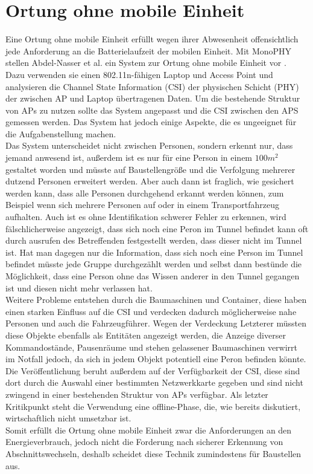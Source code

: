\section{Ortung ohne mobile Einheit}
Eine Ortung ohne mobile Einheit erfüllt wegen ihrer Abwesenheit offensichtlich jede Anforderung an die Batterielaufzeit der mobilen Einheit.
Mit MonoPHY stellen Abdel-Nasser et al. ein System zur Ortung ohne mobile Einheit vor \cite{abdel2013monophy}. \\
Dazu verwenden sie einen 802.11n-fähigen Laptop und Access Point und analysieren die Channel State Information (CSI) der physischen Schicht (PHY) der zwischen AP und Laptop übertragenen Daten.
Um die bestehende Struktur von APs zu nutzen sollte das System angepasst und die CSI zwischen den APS gemessen werden.
Das System hat jedoch einige Aspekte, die es ungeeignet für die Aufgabenstellung machen.\\
Das System unterscheidet nicht zwischen Personen, sondern erkennt nur, dass jemand anwesend ist, außerdem ist es nur für eine Person in einem $100m^2$ gestaltet worden und müsste auf Baustellengröße und die Verfolgung mehrerer dutzend Personen erweitert werden.
Aber auch dann ist fraglich, wie gesichert werden kann, dass alle Personen durchgehend erkannt werden können, zum Beispiel wenn sich mehrere Personen auf oder in einem Transportfahrzeug aufhalten.
Auch ist es ohne Identifikation schwerer Fehler zu erkennen, wird fälschlicherweise angezeigt, dass sich noch eine Peron im Tunnel befindet kann oft durch ausrufen des Betreffenden festgestellt werden, dass dieser nicht im Tunnel ist. 
Hat man dagegen nur die Information, dass sich noch eine Person im Tunnel befindet müsste jede Gruppe durchgezählt werden und selbst dann bestünde die Möglichkeit, dass eine Person ohne das Wissen anderer in den Tunnel gegangen ist und diesen nicht mehr verlassen hat.\\
Weitere Probleme entstehen durch die Baumaschinen und Container, diese haben einen starken Einfluss auf die CSI und verdecken dadurch möglicherweise nahe Personen und auch die Fahrzeugführer.
Wegen der Verdeckung Letzterer müssten diese Objekte ebenfalls als Entitäten angezeigt werden, die Anzeige diverser Kommandostände, Pausenräume und stehen gelassener Baumaschinen verwirrt im Notfall jedoch, da sich in jedem Objekt potentiell eine Peron befinden könnte.\\
Die Veröffentlichung beruht außerdem auf der Verfügbarkeit der CSI, diese sind dort durch die Auswahl einer bestimmten Netzwerkkarte gegeben und sind nicht zwingend in einer bestehenden Struktur von APs verfügbar.
Als letzter Kritikpunkt steht die Verwendung eine offline-Phase, die, wie bereits diskutiert, wirtschaftlich nicht umsetzbar ist. \\ 
Somit erfüllt die Ortung ohne mobile Einheit zwar die Anforderungen an den Energieverbrauch, jedoch nicht die Forderung nach sicherer Erkennung von Abschnittswechseln, deshalb scheidet diese Technik zumindestens für Baustellen aus.


